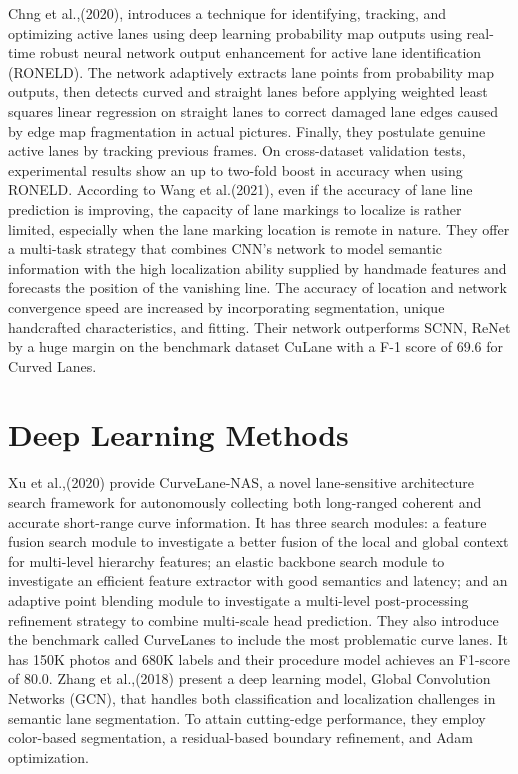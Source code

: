 Chng et al.,(2020)\cite{chng_roneld_2020}, introduces a technique for identifying, tracking, and optimizing active lanes using deep learning probability map outputs using real-time robust neural network output enhancement for active lane identification (RONELD). The network adaptively extracts lane points from probability map outputs, then detects curved and straight lanes before applying weighted least squares linear regression on straight lanes to correct damaged lane edges caused by edge map fragmentation in actual pictures. Finally, they postulate genuine active lanes by tracking previous frames. On cross-dataset validation tests, experimental results show an up to two-fold boost in accuracy when using RONELD.  
According to Wang et al.(2021)\cite{wang_multitask_2021}, even if the accuracy of lane line prediction is improving, the capacity of lane markings to localize is rather limited, especially when the lane marking location is remote in nature. They offer a multi-task strategy that combines CNN's network to model semantic information with the high localization ability supplied by handmade features and forecasts the position of the vanishing line. The accuracy of location and network convergence speed are increased by incorporating segmentation, unique handcrafted characteristics, and fitting. Their network outperforms SCNN, ReNet by a huge margin on the benchmark dataset CuLane with a F-1 score of 69.6 for Curved Lanes. 

\section{Deep Learning Methods}

Xu et al.,(2020)\cite{xu_curvelane-nas_2020} provide CurveLane-NAS, a novel lane-sensitive architecture search framework for autonomously collecting both long-ranged coherent and accurate short-range curve information. It has three search modules: a feature fusion search module to investigate a better fusion of the local and global context for multi-level hierarchy features; an elastic backbone search module to investigate an efficient feature extractor with good semantics and latency; and an adaptive point blending module to investigate a multi-level post-processing refinement strategy to combine multi-scale head prediction. They also introduce the benchmark called CurveLanes\cite{soulmateb_soulmatebcurvelanes_2021} to include the most problematic curve lanes. It has 150K photos and 680K labels and their procedure model achieves an F1-score of 80.0. 
Zhang et al.,(2018)\cite{zhang_end_2018} present a deep learning model, Global Convolution Networks (GCN), that handles both classification and localization challenges in semantic lane segmentation. To attain cutting-edge performance, they employ color-based segmentation, a residual-based boundary refinement, and Adam optimization. 

